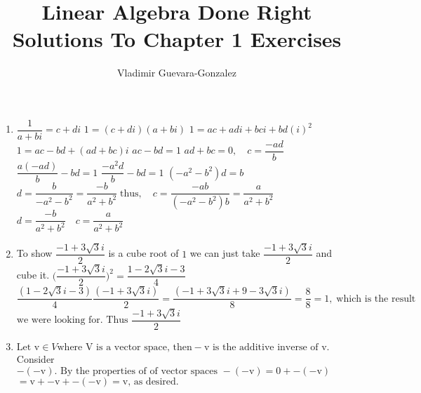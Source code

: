\documentclass{article}
\begin{document}
\title{Linear Algebra Done Right \protect\\
  Solutions To Chapter 1 Exercises}
\author{Vladimir Guevara-Gonzalez}
\maketitle
\thispagestyle{fancy}
\begin{enumerate}
\item \( \dfrac{1}{a+bi} = c+di\) \newline
  \(1 = (c+di)(a+bi)\) \newline
  \(1 = ac + adi + bci + bd(i)^{2}\) \newline
  \(1 = ac - bd + (ad+bc)i\) \newline
  \newline
  \(ac-bd=1\) \newline
  \(ad + bc = 0,  \quad   c  = \dfrac{-ad}{b}\)\newline
  \(\dfrac{a(-ad)}{b} - bd = 1\) \newline
  \(\dfrac{-a^{2}d}{b} - bd = 1\) \newline
  \((-a^{2}-b^{2})d = b\) \newline
  \(d = \dfrac{b}{-a^{2}-b^{2}} = \dfrac{-b}{a^{2}+b^{2}} \; \text{thus},
  \quad c = \dfrac{-ab}{(-a^{2}-b^{2})b} = \dfrac{a}{a^{2}+b^{2}}\) \newline
  \(d = \dfrac{-b}{a^{2}+b^{2}} \quad c = \dfrac{a}{a^{2}+b^{2}}\)
\item
  To show \(\dfrac{-1+3\sqrt{3}i}{2} \) is a cube root of $1$ we can just take
  \(\dfrac{-1+3\sqrt{3}i}{2} \) and cube it. \newline \newline
  \(\biggl(\dfrac{-1+3\sqrt{3}i}{2}\biggr)^{2}  = \dfrac{1-2\sqrt{3}i-3}{4}\) \newline \newline
  \( \dfrac{(1-2\sqrt{3}i-3)}{4} \dfrac{(-1+3\sqrt{3}i)}{2} =
  \dfrac{(-1 + 3\sqrt{3}i + 9 -3\sqrt{3}i)}{8} = \dfrac{8}{8} = 1, \;
  \text{which is the result }\) \newline
  \(\text{we were looking for. Thus }\dfrac{-1+3\sqrt{3}i}{2} \) 

\item
  \(\text{Let v}  \in V \text{where V is a vector space, then} -\text{v} \text{ is the additive
    inverse of v.} \) \newline
  Consider \( -(-\text{v})\text{. By the properties of of vector spaces }
  -(-\text{v}) = 0 + -(-\text{v})\)\newline
  \(= \text{v} + -\text{v} + -(-\text{v}) = \text{v, as desired.}\)

\end{enumerate}
\end{document}
